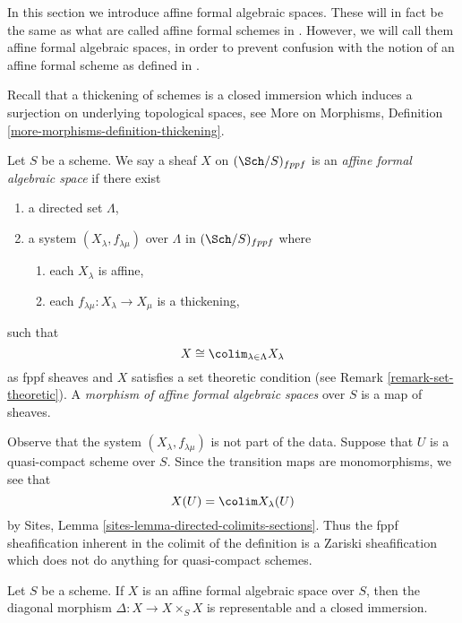 \noindent
In this section we introduce affine formal algebraic spaces.
These will in fact be the same as what are called affine
formal schemes in \cite{BVGD}. However, we will call
them affine formal algebraic spaces, in order to prevent confusion with
the notion of an affine formal scheme as defined in \cite{EGA}.

\medskip\noindent
Recall that a thickening of schemes is a closed
immersion which induces a surjection on underlying topological
spaces, see More on Morphisms, Definition
\ref{more-morphisms-definition-thickening}.

\begin{definition}
\label{definition-affine-formal-algebraic-space}
Let $S$ be a scheme. We say a sheaf $X$ on $(\Sch/S)_{fppf}$ is an
{\it affine formal algebraic space} if there exist
\begin{enumerate}
\item a directed set $\Lambda$,
\item a system $(X_\lambda, f_{\lambda \mu})$ over $\Lambda$
in $(\Sch/S)_{fppf}$ where
\begin{enumerate}
\item each $X_\lambda$ is affine,
\item each $f_{\lambda \mu} : X_\lambda \to X_\mu$ is a thickening,
\end{enumerate}
\end{enumerate}
such that
$$
X \cong \colim_{\lambda \in \Lambda} X_\lambda
$$
as fppf sheaves and $X$ satisfies a set theoretic condition
(see Remark \ref{remark-set-theoretic}). A
{\it morphism of affine formal algebraic spaces}
over $S$ is a map of sheaves.
\end{definition}

\noindent
Observe that the system $(X_\lambda, f_{\lambda \mu})$ is not
part of the data. Suppose that $U$ is a quasi-compact scheme over $S$.
Since the transition maps are monomorphisms, we see that
$$
X(U) = \colim X_\lambda(U)
$$
by Sites, Lemma \ref{sites-lemma-directed-colimits-sections}.
Thus the fppf sheafification inherent in the colimit of the
definition is a Zariski sheafification which does not do
anything for quasi-compact schemes.

\begin{lemma}
\label{lemma-diagonal-affine-formal-algebraic-space}
Let $S$ be a scheme. If $X$ is an affine formal algebraic space over
$S$, then the diagonal morphism $\Delta : X \to X \times_S X$
is representable and a closed immersion.
\end{lemma}

